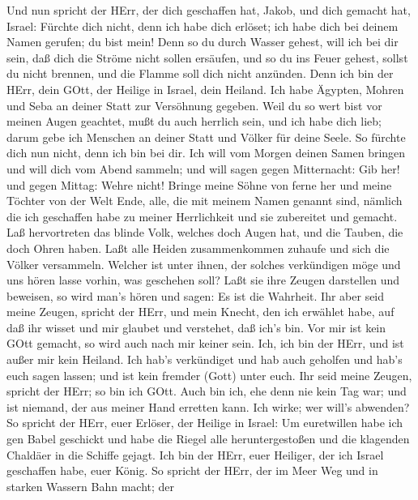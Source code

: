  Und nun spricht der HErr, der dich geschaffen hat, Jakob,
und dich gemacht hat, Israel: Fürchte dich nicht, denn ich habe dich
erlöset; ich habe dich bei deinem Namen gerufen; du bist mein!
 Denn so du durch Wasser gehest, will ich bei dir sein, daß
dich die Ströme nicht sollen ersäufen, und so du ins Feuer gehest,
sollst du nicht brennen, und die Flamme soll dich nicht anzünden.
 Denn ich bin der HErr, dein GOtt, der Heilige in Israel,
dein Heiland. Ich habe Ägypten, Mohren und Seba an deiner Statt zur
Versöhnung gegeben.  Weil du so wert bist vor meinen Augen
geachtet, mußt du auch herrlich sein, und ich habe dich lieb; darum gebe
ich Menschen an deiner Statt und Völker für deine Seele.  So
fürchte dich nun nicht, denn ich bin bei dir. Ich will vom Morgen deinen
Samen bringen und will dich vom Abend sammeln;  und will
sagen gegen Mitternacht: Gib her! und gegen Mittag: Wehre nicht! Bringe
meine Söhne von ferne her und meine Töchter von der Welt Ende,
 alle, die mit meinem Namen genannt sind, nämlich die ich
geschaffen habe zu meiner Herrlichkeit und sie zubereitet und gemacht.
 Laß hervortreten das blinde Volk, welches doch Augen hat,
und die Tauben, die doch Ohren haben.  Laßt alle Heiden
zusammenkommen zuhaufe und sich die Völker versammeln. Welcher ist unter
ihnen, der solches verkündigen möge und uns hören lasse vorhin, was
geschehen soll? Laßt sie ihre Zeugen darstellen und beweisen, so wird
man's hören und sagen: Es ist die Wahrheit.  Ihr aber seid
meine Zeugen, spricht der HErr, und mein Knecht, den ich erwählet habe,
auf daß ihr wisset und mir glaubet und verstehet, daß ich's bin. Vor mir
ist kein GOtt gemacht, so wird auch nach mir keiner sein. 
Ich, ich bin der HErr, und ist außer mir kein Heiland.  Ich
hab's verkündiget und hab auch geholfen und hab's euch sagen lassen; und
ist kein fremder (Gott) unter euch. Ihr seid meine Zeugen, spricht der
HErr; so bin ich GOtt.  Auch bin ich, ehe denn nie kein Tag
war; und ist niemand, der aus meiner Hand erretten kann. Ich wirke; wer
will's abwenden?  So spricht der HErr, euer Erlöser, der
Heilige in Israel: Um euretwillen habe ich gen Babel geschickt und habe
die Riegel alle heruntergestoßen und die klagenden Chaldäer in die
Schiffe gejagt.  Ich bin der HErr, euer Heiliger, der ich
Israel geschaffen habe, euer König.  So spricht der HErr,
der im Meer Weg und in starken Wassern Bahn macht;  der
